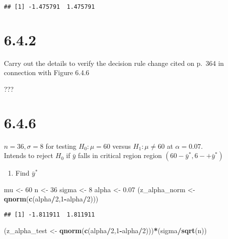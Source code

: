 \documentclass[]{article}
\newenvironment{Shaded}{\begin{snugshade}}{\end{snugshade}}
\newcommand{\KeywordTok}[1]{\textcolor[rgb]{0.13,0.29,0.53}{\textbf{#1}}}
\newcommand{\DecValTok}[1]{\textcolor[rgb]{0.00,0.00,0.81}{#1}}
\newcommand{\FloatTok}[1]{\textcolor[rgb]{0.00,0.00,0.81}{#1}}
\newcommand{\StringTok}[1]{\textcolor[rgb]{0.31,0.60,0.02}{#1}}
\newcommand{\OperatorTok}[1]{\textcolor[rgb]{0.81,0.36,0.00}{\textbf{#1}}}
\newcommand{\NormalTok}[1]{#1}
\providecommand{\tightlist}{%
  \setlength{\itemsep}{0pt}\setlength{\parskip}{0pt}}
\begin{document}
\begin{verbatim}
## [1] -1.475791  1.475791
\end{verbatim}

\section{6.4.2}\label{section-6}

Carry out the details to verify the decision rule change cited on p.~364
in connection with Figure 6.4.6

???

\section{6.4.6}\label{section-7}

\(n=36, \sigma = 8\) for testing \(H_0 : \mu = 60\) versus
\(H_1 : \mu \neq 60\) at \(\alpha=0.07\).\\
Intends to reject \(H_0\) if \(\bar{y}\) falls in critical region region
\((60-\bar{y}^*,6-+\bar{y}^*)\)

\begin{enumerate}
\def\labelenumi{(\alph{enumi})}
\tightlist
\item
  Find \(\bar{y}^*\)
\end{enumerate}

\begin{Shaded}
\begin{Highlighting}[]
\NormalTok{mu <-}\StringTok{ }\DecValTok{60}
\NormalTok{n <-}\StringTok{ }\DecValTok{36}
\NormalTok{sigma <-}\StringTok{ }\DecValTok{8}
\NormalTok{alpha <-}\StringTok{ }\FloatTok{0.07}
\NormalTok{(z_alpha_norm <-}\StringTok{ }\KeywordTok{qnorm}\NormalTok{(}\KeywordTok{c}\NormalTok{(alpha}\OperatorTok{/}\DecValTok{2}\NormalTok{,}\DecValTok{1}\OperatorTok{-}\NormalTok{alpha}\OperatorTok{/}\DecValTok{2}\NormalTok{)))}
\end{Highlighting}
\end{Shaded}

\begin{verbatim}
## [1] -1.811911  1.811911
\end{verbatim}

\begin{Shaded}
\begin{Highlighting}[]
\NormalTok{(z_alpha_test <-}\StringTok{ }\KeywordTok{qnorm}\NormalTok{(}\KeywordTok{c}\NormalTok{(alpha}\OperatorTok{/}\DecValTok{2}\NormalTok{,}\DecValTok{1}\OperatorTok{-}\NormalTok{alpha}\OperatorTok{/}\DecValTok{2}\NormalTok{)))}\OperatorTok{*}\NormalTok{(sigma}\OperatorTok{/}\KeywordTok{sqrt}\NormalTok{(n))}
\end{Highlighting}
\end{Shaded}
\end{document}
